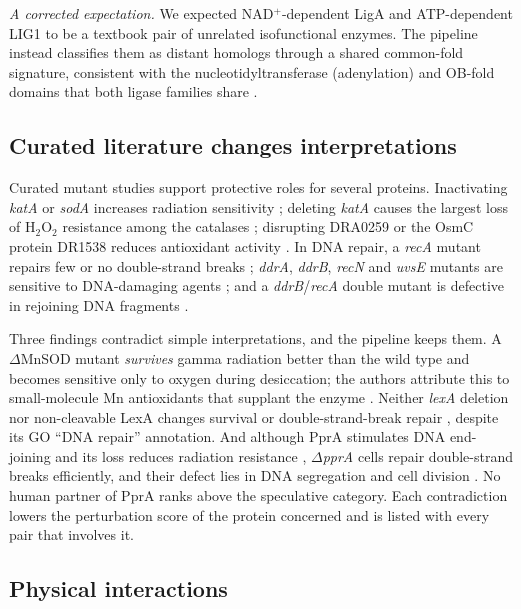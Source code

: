 \documentclass[conference]{IEEEtran}
\newcommand{\gene}[1]{\textit{#1}}
\begin{document}
\emph{A corrected expectation.} We expected NAD$^+$-dependent LigA and ATP-dependent LIG1 to be a
textbook pair of unrelated isofunctional enzymes. The pipeline instead classifies them as distant
homologs through a shared common-fold signature, consistent with the nucleotidyltransferase
(adenylation) and OB-fold domains that both ligase families share \cite{shuman2004}.

\subsection{Curated literature changes interpretations}

Curated mutant studies support protective roles for several proteins. Inactivating \gene{katA} or
\gene{sodA} increases radiation sensitivity \cite{markillie1999}; deleting \gene{katA} causes the
largest loss of H$_2$O$_2$ resistance among the catalases \cite{jeong2015}; disrupting DRA0259 or
the OsmC protein DR1538 reduces antioxidant activity \cite{wang2016}. In DNA repair, a
\gene{recA} mutant repairs few or no double-strand breaks \cite{daly1994}; \gene{ddrA},
\gene{ddrB}, \gene{recN} and \gene{uvsE} mutants are sensitive to DNA-damaging agents
\cite{harris2004,selvam2013,funayama1999,earl2002}; and a \gene{ddrB}/\gene{recA} double mutant
is defective in rejoining DNA fragments \cite{xu2010}.

Three findings contradict simple interpretations, and the pipeline keeps them. A $\Delta$MnSOD
mutant \emph{survives} gamma radiation better than the wild type and becomes sensitive only to
oxygen during desiccation; the authors attribute this to small-molecule Mn antioxidants that
supplant the enzyme \cite{gaidamakova2022}. Neither \gene{lexA} deletion nor non-cleavable LexA
changes survival or double-strand-break repair \cite{jolivet2006}, despite its GO ``DNA repair''
annotation. And although PprA stimulates DNA end-joining and its loss reduces radiation resistance
\cite{narumi2004}, $\Delta$\gene{pprA} cells repair double-strand breaks efficiently, and their
defect lies in DNA segregation and cell division \cite{devigne2013}. No human partner of PprA ranks
above the speculative category. Each contradiction lowers the perturbation
score of the protein concerned and is listed with every pair that involves it.

\subsection{Physical interactions}
\label{sec:physical}
\end{document}
